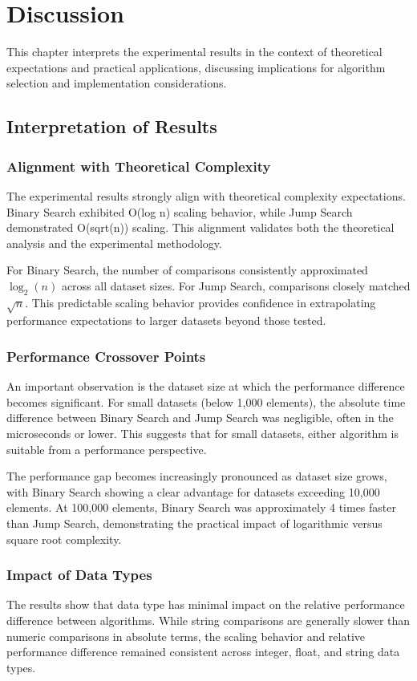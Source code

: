 \chapter{Discussion}

This chapter interprets the experimental results in the context of theoretical expectations and practical applications, discussing implications for algorithm selection and implementation considerations.

\section{Interpretation of Results}

\subsection{Alignment with Theoretical Complexity}
The experimental results strongly align with theoretical complexity expectations. Binary Search exhibited O(log n) scaling behavior, while Jump Search demonstrated O(sqrt(n)) scaling. This alignment validates both the theoretical analysis and the experimental methodology.

For Binary Search, the number of comparisons consistently approximated $\log_2(n)$ across all dataset sizes. For Jump Search, comparisons closely matched $\sqrt{n}$. This predictable scaling behavior provides confidence in extrapolating performance expectations to larger datasets beyond those tested.

\subsection{Performance Crossover Points}
An important observation is the dataset size at which the performance difference becomes significant. For small datasets (below 1,000 elements), the absolute time difference between Binary Search and Jump Search was negligible, often in the microseconds or lower. This suggests that for small datasets, either algorithm is suitable from a performance perspective.

The performance gap becomes increasingly pronounced as dataset size grows, with Binary Search showing a clear advantage for datasets exceeding 10,000 elements. At 100,000 elements, Binary Search was approximately 4 times faster than Jump Search, demonstrating the practical impact of logarithmic versus square root complexity.

\subsection{Impact of Data Types}
The results show that data type has minimal impact on the relative performance difference between algorithms. While string comparisons are generally slower than numeric comparisons in absolute terms, the scaling behavior and relative performance difference remained consistent across integer, float, and string data types.

